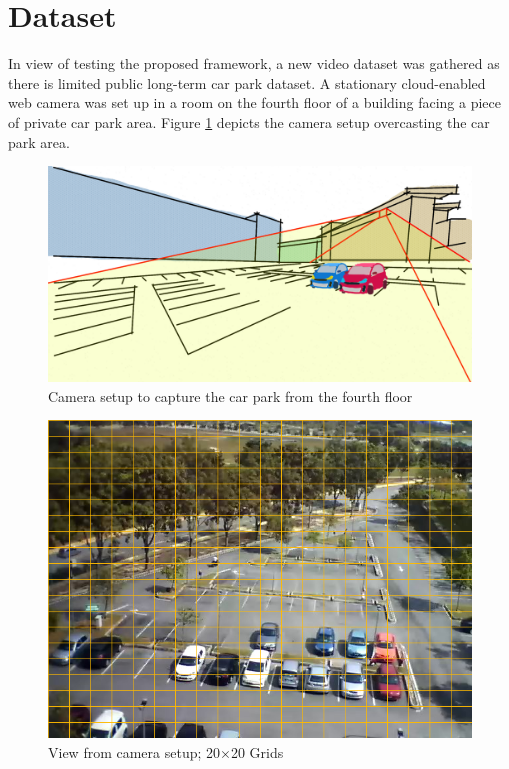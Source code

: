 \section{Dataset}
\label{section:dataset_used}

In view of testing the proposed framework, a new video dataset was gathered as there is limited public long-term car park dataset. A stationary cloud-enabled web camera was set up in a room on the fourth floor of a building facing a piece of private car park area. Figure \ref{fig:camerasetup} depicts the camera setup overcasting the car park area.



\begin{figure}[hbt!]\centering
\includegraphics[width=.8\textwidth]{image/new/fcicarpark2.png}
\caption{Camera setup to capture the car park from the fourth floor}
\label{fig:camerasetup}
\end{figure}


\begin{figure}[!hbt]\centering
\includegraphics[width=.7\textwidth]{image/general/grids.png}
\caption{View from camera setup; 20$\times$20 Grids}
\label{fig:viewfromcamera}
\end{figure}


